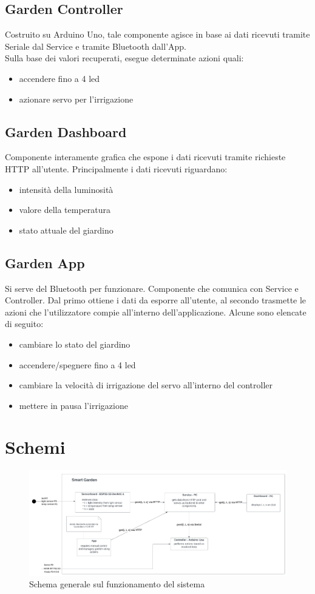 \documentclass[a4paper, 12pt]{article}
\begin{document}
\subsection{Garden Controller}
Costruito su Arduino Uno, tale componente agisce in base ai dati ricevuti tramite Seriale dal Service e tramite Bluetooth dall'App.\\
Sulla base dei valori recuperati, esegue determinate azioni quali:
\begin{itemize}
    \item accendere fino a 4 led
    \item azionare servo per l'irrigazione
\end{itemize}
\subsection{Garden Dashboard}
Componente interamente grafica che espone i dati ricevuti tramite richieste HTTP all'utente. Principalmente i dati ricevuti riguardano:
\begin{itemize}
    \item intensità della luminosità
    \item valore della temperatura
    \item stato attuale del giardino
\end{itemize}
\subsection{Garden App}
Si serve del Bluetooth per funzionare. Componente che comunica con Service e Controller. Dal primo ottiene i dati da esporre all'utente, al secondo trasmette le azioni che l'utilizzatore compie all'interno dell'applicazione. Alcune sono elencate di seguito:
\begin{itemize}
    \item cambiare lo stato del giardino
    \item accendere/spegnere fino a 4 led
    \item cambiare la velocità di irrigazione del servo all'interno del controller
    \item mettere in pausa l'irrigazione
\end{itemize}
\clearpage
\section{Schemi}
\begin{figure}[h]
    \includegraphics[scale=0.5]{general_smart_garden}
    \caption{Schema generale sul funzionamento del sistema}
\end{figure}
\end{document}
